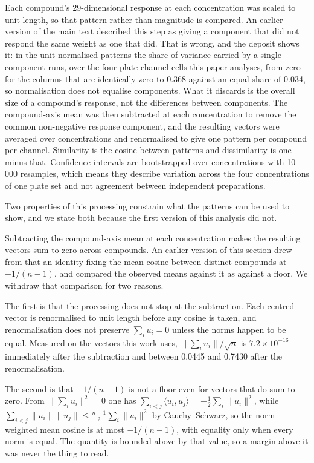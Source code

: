 \documentclass[11pt,a4paper]{article}
\begin{document}
Each compound's 29-dimensional response at each concentration was scaled to unit
length, so that pattern rather than magnitude is compared. An earlier version of
the main text described this step as giving a component that did not respond the
same weight as one that did. That is wrong, and the deposit shows it: in the
unit-normalised patterns the share of variance carried by a single component
runs, over the four plate-channel cells this paper analyses, from zero for the
columns that are identically zero to 0.368 against an equal share of 0.034, so
normalisation does not equalise components. What it discards is the overall size of a
compound's response, not the differences between components. The compound-axis mean
was then subtracted at each concentration to remove the common non-negative
response component, and the resulting vectors were averaged over concentrations
and renormalised to give one pattern per compound per channel. Similarity is the
cosine between patterns and dissimilarity is one minus that. Confidence intervals
are bootstrapped over concentrations with 10\,000 resamples, which means they
describe variation across the four concentrations of one plate set and not
agreement between independent preparations.

Two properties of this processing constrain what the patterns can be used to
show, and we state both because the first version of this analysis did not.

Subtracting the compound-axis mean at each concentration makes the resulting
vectors sum to zero across compounds. An earlier version of this section drew
from that an identity fixing the mean cosine between distinct compounds at
$-1/(n-1)$, and compared the observed means against it as against a floor. We
withdraw that comparison for two reasons.

The first is that the processing does not stop at the subtraction. Each centred
vector is renormalised to unit length before any cosine is taken, and
renormalisation does not preserve $\sum_i u_i = 0$ unless the norms happen to
be equal. Measured on the vectors this work uses,
$\lVert\sum_i u_i\rVert/\sqrt{n}$ is $7.2\times10^{-16}$ immediately after
the subtraction and between 0.0445 and 0.7430 after the renormalisation.

The second is that $-1/(n-1)$ is not a floor even for vectors that do sum to
zero. From $\lVert\sum_i u_i\rVert^2 = 0$ one has
$\sum_{i<j}\langle u_i, u_j\rangle = -\tfrac{1}{2}\sum_i \lVert u_i\rVert^2$,
while $\sum_{i<j}\lVert u_i\rVert\lVert u_j\rVert \le
\tfrac{n-1}{2}\sum_i \lVert u_i\rVert^2$ by Cauchy--Schwarz, so the
norm-weighted mean cosine is at most $-1/(n-1)$, with equality only when every
norm is equal. The quantity is bounded above by that value, so a margin above
it was never the thing to read.
\end{document}
